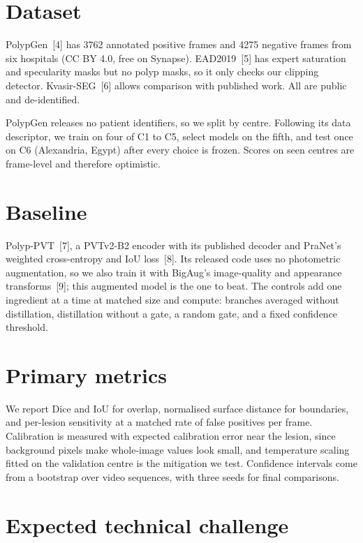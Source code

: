 \documentclass[10pt,a4paper]{article}
\begin{document}
\section{Dataset}

PolypGen~[4] has 3762 annotated positive frames and 4275 negative frames from six hospitals (CC BY 4.0, free on Synapse). EAD2019~[5] has expert saturation and specularity masks but
no polyp masks, so it only checks our clipping detector. Kvasir-SEG~[6] allows comparison
with published work. All are public and de-identified.

PolypGen releases no patient identifiers, so we split by centre. Following its data descriptor, we
train on four of C1 to C5, select models on the fifth, and test once on C6 (Alexandria, Egypt) after
every choice is frozen. Scores on seen centres are frame-level and therefore optimistic.

\section{Baseline}

Polyp-PVT~[7], a PVTv2-B2 encoder with its published decoder and PraNet's weighted cross-entropy and
IoU loss~[8]. Its released code uses no photometric augmentation, so we also train it with BigAug's
image-quality and appearance transforms~[9]; this augmented model is the one to beat. The controls
add one ingredient at a time at matched size and compute: branches averaged without distillation,
distillation without a gate, a random gate, and a fixed confidence threshold.

\section{Primary metrics}

We report Dice and IoU for overlap, normalised surface distance for boundaries, and per-lesion
sensitivity at a matched rate of false positives per frame. Calibration is measured with expected
calibration error near the lesion, since background pixels make whole-image values look small, and
temperature scaling fitted on the validation centre is the mitigation we test. Confidence intervals
come from a bootstrap over video sequences, with three seeds for final comparisons.

\section{Expected technical challenge}
\end{document}
